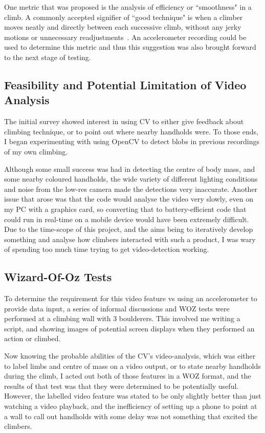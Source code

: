 One metric that was proposed is the analysis of efficiency or ``smoothness" in a climb.
A commonly accepted signifier of ``good technique" is when a climber moves neatly and directly between each successive climb, without any jerky motions or unnecessary readjustments~\cite{centreofmass}.
An accelerometer recording could be used to determine this metric and thus this suggestion was also brought forward to the next stage of testing.


\subsection{Feasibility and Potential Limitation of Video Analysis}
The initial survey showed interest in using CV to either give feedback about climbing technique, or to point out where nearby handholds were.
To those ends, I began experimenting with using OpenCV to detect blobs in previous recordings of my own climbing.

Although some small success was had in detecting the centre of body mass, and some nearby coloured handholds, the wide variety of different lighting conditions and noise from the low-res camera made the detections very inaccurate.
Another issue that arose was that the code would analyse the video very slowly, even on my PC with a graphics card, so converting that to battery-efficient code that could run in real-time on a mobile device would have been extremely difficult.
Due to the time-scope of this project, and the aims being to iteratively develop something and analyse how climbers interacted with such a product, I was wary of spending too much time trying to get video-detection working.


\subsection{Wizard-Of-Oz Tests}
To determine the requirement for this video feature vs using an accelerometer to provide data input, a series of informal discussions and WOZ tests were performed at a climbing wall with 3 boulderers.
This involved me writing a script, and showing images of potential screen displays when they performed an action or climbed.

Now knowing the probable abilities of the CV's video-analysis, which was either to label limbs and centre of mass on a video output, or to state nearby handholds during the climb, I acted out both of those features in a WOZ format, and the results of that test was that they were determined to be potentially useful.
However, the labelled video feature was stated to be only slightly better than just watching a video playback, and the inefficiency of setting up a phone to point at a wall to call out handholds with some delay was not something that excited the climbers.

